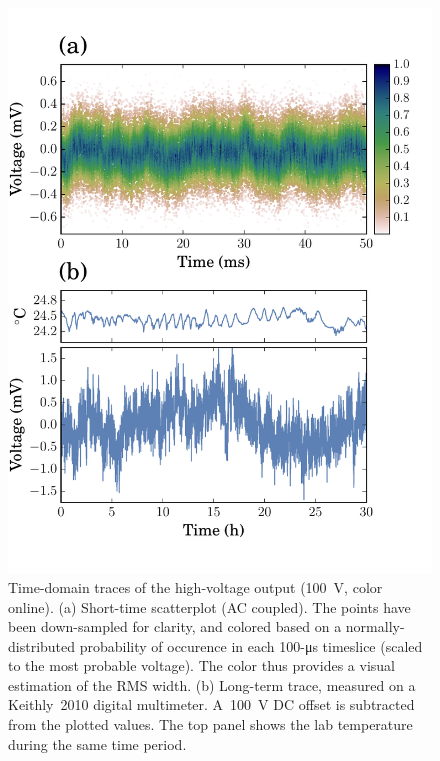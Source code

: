 \documentclass[aip,rsi,reprint]{revtex4-1} %
\begin{document}
\begin{figure}[b]
\includegraphics[width=\columnwidth]{TimeDomain}
\caption{Time-domain traces of the high-voltage output (\SI{100}{\volt}, color online). (a) Short-time scatterplot  (AC coupled). 
The points have been down-sampled for clarity, and colored based on a normally-distributed probability of occurence in each 100-\si{\micro\second} timeslice (scaled to the most probable voltage).
The color thus provides a visual estimation of the RMS width.
(b) Long-term trace, measured on a Keithly~2010 digital multimeter. A~\SI{100}{\volt} DC offset is subtracted from the plotted values. The top panel shows the lab temperature during the same time period.\label{Fig:TimeDomain}}
\end{figure}
\end{document}
